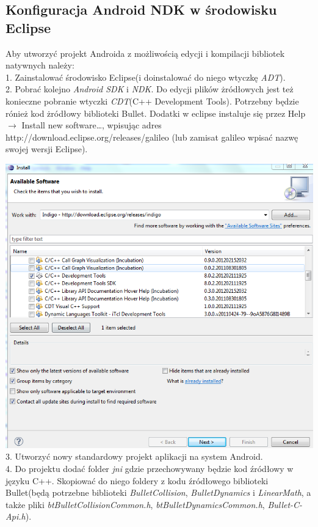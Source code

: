   \subsection{Konfiguracja Android NDK w środowisku Eclipse}
  Aby utworzyć projekt Androida z możliwością edycji i kompilacji bibliotek
  natywnych należy: \\
  1. Zainstalować środowisko Eclipse(i doinstalować do niego wtyczkę
  \emph{ADT}).\\
  2. Pobrać kolejno \emph{Android SDK} i \emph{NDK}. Do edycji plików żródłowych
  jest też konieczne pobranie wtyczki \emph{CDT}(C++ Development Tools). Potrzebny
  będzie rónież kod żródłowy biblioteki Bullet. Dodatki w eclipse instaluje się
  przez Help $ \rightarrow $ Install new software\ldots , wpisując adres
  http://download.eclipse.org/releases/galileo (lub zamisat galileo wpisać nazwę swojej wersji Eclipse).
  
  \includegraphics[width=\textwidth]{./img/CDT.png}
  3. Utworzyć nowy standardowy projekt aplikacji na system Android.\\
  4. Do projektu dodać folder \emph{jni} gdzie przechowywany będzie kod źródłowy
  w języku C++. Skopiować do niego foldery z kodu źródłowego biblioteki
  Bullet(będą potrzebne biblioteki \emph{BulletCollision}, \emph{BulletDynamics}
  i \emph{LinearMath}, a także pliki \emph{btBulletCollisionCommon.h},
  \emph{btBulletDynamicsCommon.h}, \emph{Bullet-C-Api.h}).
  
